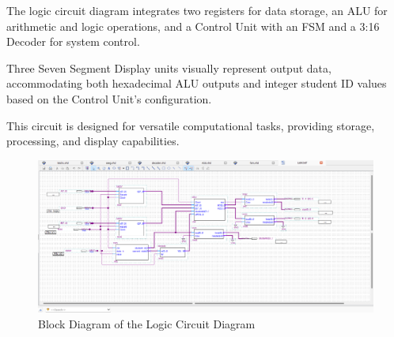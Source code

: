 
{The logic circuit diagram integrates two registers for data storage, an ALU for arithmetic and logic operations, and a Control Unit with an FSM and a 3:16 Decoder for system control.}

{Three Seven Segment Display units visually represent output data, accommodating both hexadecimal ALU outputs and integer student ID values based on the Control Unit's configuration.}

{This circuit is designed for versatile computational tasks, providing storage, processing, and display capabilities.}

\begin{figure}[H]
    \centering
    \includegraphics[width=16cm]{Pictures/BlockDiagram.png}
    \caption{{Block Diagram of the Logic Circuit Diagram}}
    \label{FSM}
\end{figure}
